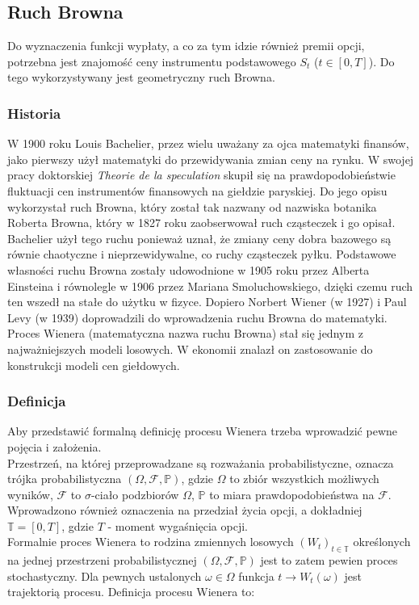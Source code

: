 \documentclass[12pt]{article}
\begin{document}
\subsection{Ruch Browna}

Do wyznaczenia funkcji wypłaty, a co za tym idzie również premii opcji, potrzebna jest znajomość ceny instrumentu podstawowego $S_t$ ($t \in [0,T]$). Do tego wykorzystywany jest geometryczny ruch Browna.

\subsubsection{Historia}

W 1900 roku Louis Bachelier, przez wielu uważany za ojca matematyki finansów, jako pierwszy użył matematyki do przewidywania zmian ceny na rynku. W swojej pracy doktorskiej \textit{Theorie de la speculation} skupił się na prawdopodobieństwie fluktuacji cen instrumentów finansowych na giełdzie paryskiej. Do jego opisu wykorzystał ruch Browna, który został tak nazwany od nazwiska botanika Roberta Browna, który w 1827 roku zaobserwował ruch cząsteczek i go opisał. Bachelier użył tego ruchu ponieważ uznał, że zmiany ceny dobra bazowego są równie chaotyczne i nieprzewidywalne, co ruchy cząsteczek pyłku. Podstawowe własności ruchu Browna zostały udowodnione w 1905 roku przez Alberta Einsteina i równolegle w 1906 przez Mariana Smoluchowskiego, dzięki czemu ruch ten wszedł na stałe do użytku w fizyce. Dopiero Norbert Wiener (w 1927) i Paul Levy (w 1939) doprowadzili do wprowadzenia ruchu Browna do matematyki. Proces Wienera (matematyczna nazwa ruchu Browna) stał się jednym z najważniejszych modeli losowych. W ekonomii znalazł on zastosowanie do konstrukcji modeli cen giełdowych.\\

\subsubsection{Definicja}
Aby przedstawić formalną definicję procesu Wienera trzeba wprowadzić pewne pojęcia i założenia. \\

Przestrzeń, na której przeprowadzane są rozważania probabilistyczne, oznacza trójka probabilistyczna $(\Omega, \mathcal{F}, \mathbb{P})$, gdzie $\Omega$ to zbiór wszystkich możliwych wyników, $\mathcal{F}$ to $\sigma$-ciało podzbiorów $\Omega$, $\mathbb{P}$ to miara prawdopodobieństwa na $\mathcal{F}$. Wprowadzono również oznaczenia na przedział życia opcji, a dokładniej $\mathbb{T} = [0,T]$, gdzie $T$ - moment wygaśnięcia opcji.\\
\newline
Formalnie proces Wienera to rodzina zmiennych losowych $(W_t)_{t\in \mathbb{T}}$  określonych na jednej przestrzeni probabilistycznej $(\Omega, \mathcal{F}, \mathbb{P})$ jest to zatem pewien proces stochastyczny. Dla pewnych ustalonych $\omega \in \Omega$ funkcja $t \rightarrow W_t(\omega)$ jest trajektorią procesu. Definicja procesu Wienera to:
\end{document}
